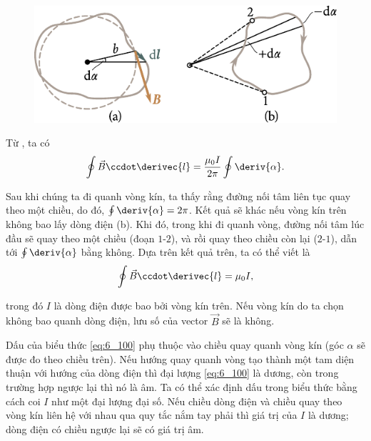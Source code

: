 \begin{figure}[t]
	\begin{center}
		\includegraphics[scale=1.0]{figures/ch_06/fig_6_24.pdf}
		\caption[]{}
		\label{fig:6_24}
	\end{center}
	\vspace{-0.8cm}
\end{figure}

Từ , ta có
\begin{equation}\label{eq:6_99}
    \oint \vec{B} \ccdot \derivec{l} = \frac{\mu_0 I}{2\pi} \oint \deriv{\alpha}.
\end{equation}

\noindent
Sau khi chúng ta đi quanh vòng kín, ta thấy rằng đường nối tâm liên tục quay theo một chiều, do đó, $\oint\deriv{\alpha}= 2\pi$. Kết quả sẽ khác nếu vòng kín trên không bao lấy dòng điện (b). Khi đó, trong khi đi quanh vòng, đường nối tâm lúc đầu sẽ quay theo một chiều (đoạn $1$-$2$), và rồi quay theo chiều còn lại ($2$-$1$), dẫn tới $\oint\deriv{\alpha}$ bằng không. Dựa trên kết quả trên, ta có thể viết là
\begin{equation}\label{eq:6_100}
    \oint \vec{B} \ccdot \derivec{l} = \mu_0 I,
\end{equation}

\noindent
trong đó $I$ là dòng điện được bao bởi vòng kín trên. Nếu vòng kín do ta chọn không bao quanh dòng điện, lưu số của vector $\vec{B}$ sẽ là không.

Dấu của biểu thức \eqref{eq:6_100} phụ thuộc vào chiều quay quanh vòng kín (góc $\alpha$ sẽ được đo theo chiều trên). Nếu hướng quay quanh vòng tạo thành một tam diện thuận với hướng của dòng điện thì đại lượng \eqref{eq:6_100} là dương, còn trong trường hợp ngược lại thì nó là âm. Ta có thể xác định dấu trong biểu thức bằng cách coi $I$ như một đại lượng đại số. Nếu chiều dòng điện và chiều quay theo vòng kín liên hệ với nhau qua quy tắc nắm tay phải thì giá trị của $I$ là dương; dòng điện có chiều ngược lại sẽ có giá trị âm.

